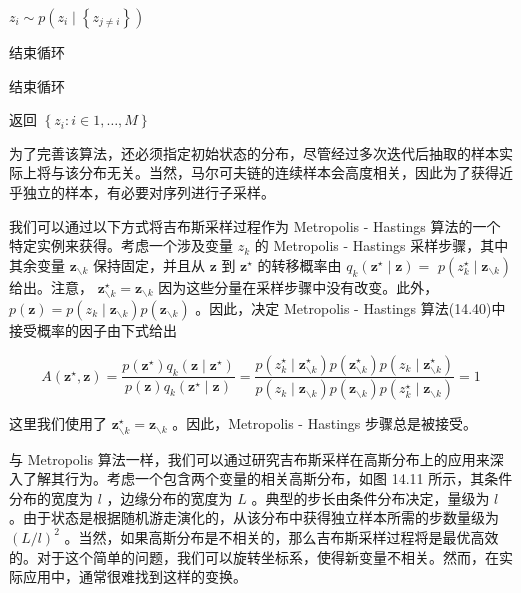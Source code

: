 \documentclass[10pt]{report}
\begin{document}
\({z}_{i} \sim  p\left( {{z}_{i} \mid  \left\{  {z}_{j \neq  i}\right\}  }\right)\)

结束循环

结束循环

返回 \(\left\{  {{z}_{i} : i \in  1,\ldots ,M}\right\}\)

为了完善该算法，还必须指定初始状态的分布，尽管经过多次迭代后抽取的样本实际上将与该分布无关。当然，马尔可夫链的连续样本会高度相关，因此为了获得近乎独立的样本，有必要对序列进行子采样。

我们可以通过以下方式将吉布斯采样过程作为 Metropolis - Hastings 算法的一个特定实例来获得。考虑一个涉及变量 \({z}_{k}\) 的 Metropolis - Hastings 采样步骤，其中其余变量 \({\mathbf{z}}_{\smallsetminus k}\) 保持固定，并且从 \(\mathbf{z}\) 到 \({\mathbf{z}}^{ \star  }\) 的转移概率由 \({q}_{k}\left( {{\mathbf{z}}^{ \star  } \mid  \mathbf{z}}\right)  =\)  \(p\left( {{z}_{k}^{ \star  } \mid  {\mathbf{z}}_{\smallsetminus k}}\right)\) 给出。注意， \({\mathbf{z}}_{\smallsetminus k}^{ \star  } = {\mathbf{z}}_{\smallsetminus k}\) 因为这些分量在采样步骤中没有改变。此外， \(p\left( \mathbf{z}\right)  = p\left( {{z}_{k} \mid  {\mathbf{z}}_{\smallsetminus k}}\right) p\left( {\mathbf{z}}_{\smallsetminus k}\right)\) 。因此，决定 Metropolis - Hastings 算法(14.40)中接受概率的因子由下式给出

\[
A\left( {{\mathbf{z}}^{ \star  },\mathbf{z}}\right)  = \frac{p\left( {\mathbf{z}}^{ \star  }\right) {q}_{k}\left( {\mathbf{z} \mid  {\mathbf{z}}^{ \star  }}\right) }{p\left( \mathbf{z}\right) {q}_{k}\left( {{\mathbf{z}}^{ \star  } \mid  \mathbf{z}}\right) } = \frac{p\left( {{z}_{k}^{ \star  } \mid  {\mathbf{z}}_{\smallsetminus k}^{ \star  }}\right) p\left( {\mathbf{z}}_{\smallsetminus k}^{ \star  }\right) p\left( {{z}_{k} \mid  {\mathbf{z}}_{\smallsetminus k}^{ \star  }}\right) }{p\left( {{z}_{k} \mid  {\mathbf{z}}_{\smallsetminus k}}\right) p\left( {\mathbf{z}}_{\smallsetminus k}\right) p\left( {{z}_{k}^{ \star  } \mid  {\mathbf{z}}_{\smallsetminus k}}\right) } = 1 \tag{14.45}
\]

这里我们使用了 \({\mathbf{z}}_{\smallsetminus k}^{ \star  } = {\mathbf{z}}_{\smallsetminus k}\) 。因此，Metropolis - Hastings 步骤总是被接受。

与 Metropolis 算法一样，我们可以通过研究吉布斯采样在高斯分布上的应用来深入了解其行为。考虑一个包含两个变量的相关高斯分布，如图 14.11 所示，其条件分布的宽度为 \(l\) ，边缘分布的宽度为 \(L\) 。典型的步长由条件分布决定，量级为 \(l\) 。由于状态是根据随机游走演化的，从该分布中获得独立样本所需的步数量级为 \({\left( L/l\right) }^{2}\) 。当然，如果高斯分布是不相关的，那么吉布斯采样过程将是最优高效的。对于这个简单的问题，我们可以旋转坐标系，使得新变量不相关。然而，在实际应用中，通常很难找到这样的变换。
\end{document}
